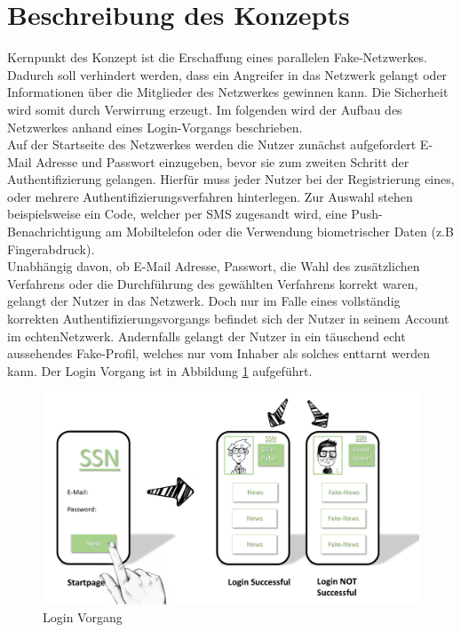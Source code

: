 \documentclass{sigchi}
\begin{document}

\section{Beschreibung des Konzepts}
\label{Konzept}
Kernpunkt des Konzept ist die Erschaffung eines parallelen Fake-Netzwerkes. Dadurch soll verhindert werden, dass ein Angreifer in das Netzwerk gelangt oder Informationen über die Mitglieder des Netzwerkes gewinnen kann. Die Sicherheit wird somit durch Verwirrung erzeugt. Im folgenden wird der Aufbau des Netzwerkes anhand eines Login-Vorgangs beschrieben. \\
Auf der Startseite des Netzwerkes werden die Nutzer zunächst aufgefordert E-Mail Adresse und Passwort einzugeben, bevor sie zum zweiten Schritt der Authentifizierung gelangen. Hierfür muss jeder Nutzer bei der Registrierung eines, oder mehrere Authentifizierungsverfahren hinterlegen. Zur Auswahl stehen beispielsweise ein Code, welcher per SMS zugesandt wird, eine Push-Benachrichtigung am Mobiltelefon oder die Verwendung biometrischer Daten (z.B Fingerabdruck).\\
Unabhängig davon, ob E-Mail Adresse, Passwort, die Wahl des zusätzlichen Verfahrens oder die Durchführung des gewählten Verfahrens korrekt waren, gelangt der Nutzer in das Netzwerk. Doch nur im Falle eines vollständig korrekten Authentifizierungsvorgangs befindet sich der Nutzer in seinem Account im \glqq echten\grqq Netzwerk. Andernfalls gelangt der Nutzer in ein täuschend echt aussehendes Fake-Profil, welches nur vom Inhaber als solches enttarnt werden kann. Der Login Vorgang ist in Abbildung \ref{fig:Login} aufgeführt. 
\begin{figure}[htbp]
	\includegraphics[width=0.8\columnwidth]{figures/LoginVorgang.PNG}
	\caption{Login Vorgang}
	\label{fig:Login}
\end{figure}
\end{document}
